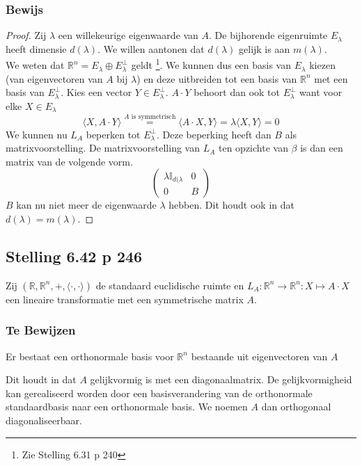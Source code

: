 \documentclass[lineaire_algebra_oplossingen.tex]{subfiles}
\begin{document}
\subsubsection*{Bewijs}
\begin{proof}
Zij $\lambda$ een willekeurige eigenwaarde van $A$. De bijhorende eigenruimte $E_\lambda$ heeft dimensie $d(\lambda)$. We willen aantonen dat $d(\lambda)$ gelijk is aan $m(\lambda)$.\\
We weten dat $\mathbb{R}^n = E_\lambda \oplus E_\lambda^\bot$ geldt \footnote{Zie Stelling 6.31 p 240}. We kunnen dus een basis van $E_\lambda$ kiezen (van eigenvectoren van $A$ bij $\lambda$) en deze uitbreiden tot een basis van $\mathbb{R}^n$ met een basis van $E_\lambda^\bot$.
Kies een vector $Y\in E_\lambda^\bot$. $A\cdot Y$ behoort dan ook tot $E_\lambda^\bot$ want voor elke $X \in E_\lambda$
\[
\langle X, A\cdot Y\rangle \overset{A \text{ is symmetrisch}}{=} \langle A\cdot X, Y \rangle = \lambda \langle X,Y \rangle = 0
\]
We kunnen nu $L_A$ beperken tot $E_\lambda^\bot$. Deze beperking heeft dan $B$ als matrixvoorstelling. De matrixvoorstelling van $L_A$ ten opzichte van $\beta$ is dan een matrix van de volgende vorm.
\[
\begin{pmatrix}
\lambda\mathbb{I}_{d(\lambda} & 0\\
0 & B
\end{pmatrix}
\]
$B$ kan nu niet meer de eigenwaarde $\lambda$ hebben. Dit houdt ook in dat $d(\lambda) = m(\lambda)$.
\end{proof}

\subsection{Stelling 6.42 p 246}
Zij $(\mathbb{R},\mathbb{R}^n,+,\langle \cdot , \cdot \rangle)$ de standaard euclidische ruimte en $L_A : \mathbb{R}^n \rightarrow \mathbb{R}^n: X \mapsto A \cdot X$ een lineaire transformatie met een symmetrische matrix $A$.

\subsubsection*{Te Bewijzen}
Er bestaat een orthonormale basis voor $\mathbb{R}^n$ bestaande uit eigenvectoren van $A$

Dit houdt in dat $A$ gelijkvormig is met een diagonaalmatrix. De gelijkvormigheid kan gerealiseerd worden door een basisverandering van de orthonormale standaardbasis naar een orthonormale basis.
We noemen $A$ dan orthogonaal diagonaliseerbaar.
\end{document}
